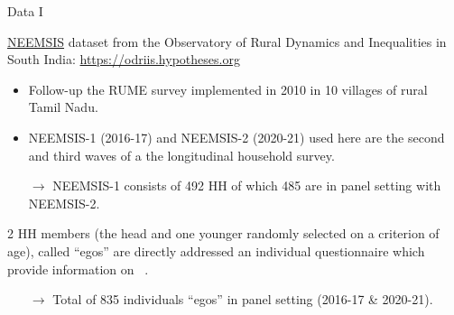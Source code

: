 \documentclass[aspectratio=169]{beamer}
\begin{document}
\begin{frame}


\end{frame}





\begin{frame}{Data I}

\href{https://neemsis.hypotheses.org/}{NEEMSIS} dataset from the Observatory of Rural Dynamics and Inequalities in South India: \href{https://odriis.hypotheses.org/}{https://odriis.hypotheses.org}
\begin{itemize}
\item Follow-up the RUME survey implemented in 2010 in 10 villages of rural Tamil Nadu.
\item NEEMSIS-1 (2016-17) and NEEMSIS-2 (2020-21) used here are the second and third waves
of a the longitudinal household survey.
\item[$\rightarrow$] NEEMSIS-1 consists of 492 HH of which 485 are in panel setting with NEEMSIS-2.
\end{itemize}

2 HH members (the head and one younger randomly selected on a criterion of age), called ``egos'' are directly addressed an individual questionnaire which provide information on \PTCS~.
\begin{itemize}
\item[$\rightarrow$] Total of 835 individuals ``egos'' in panel setting (2016-17 \& 2020-21).
\end{itemize}

\end{frame}





\end{document}
